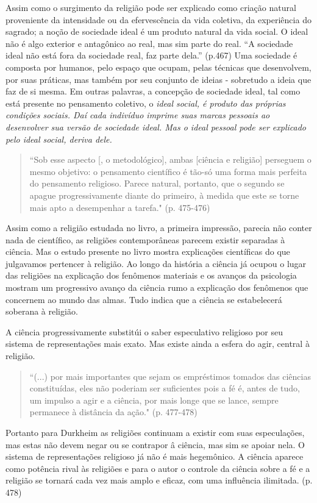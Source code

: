 \documentclass[12pt,a4paper]{article}
\begin{document}
Assim como o surgimento da religião pode ser explicado como criação natural proveniente da intensidade ou da efervescência da vida coletiva, da experiência do sagrado; a noção de sociedade ideal é um produto natural da vida social. O ideal não é algo exterior e antagônico ao real, mas sim parte do real. 
``A sociedade ideal não está fora da sociedade real, faz parte dela.”
(p.467)
Uma sociedade é composta por humanos, pelo espaço que ocupam, pelas técnicas que desenvolvem, por suas práticas, mas também por seu conjunto de ideias - sobretudo a ideia que faz de si mesma. Em outras palavras, a concepção de sociedade ideal, tal como está presente no pensamento coletivo, o \em ideal social\em, é produto das próprias condições sociais. Daí cada indivíduo imprime suas marcas pessoais ao desenvolver sua versão de sociedade ideal. Mas o \em ideal pessoal \em pode ser explicado pelo ideal social, deriva dele.




\begin{quote}
``Sob esse aspecto [, o metodológico], ambas [ciência e religião] perseguem o mesmo objetivo: o pensamento científico é tão-só uma forma mais perfeita do pensamento religioso. Parece natural, portanto, que o segundo se apague progressivamente diante do primeiro, à medida que este se torne mais apto a desempenhar a tarefa."
(p. 475-476)
\end{quote}

Assim como a religião estudada no livro, a primeira impressão, parecia não conter nada de científico, as religiões contemporâneas parecem existir separadas à ciência. Mas o estudo presente no livro mostra explicações científicas do que julgavamos pertencer à religião. Ao longo da história a ciência já ocupou o lugar das religiões na explicação dos fenômenos materiais e os avanços da psicologia mostram um progressivo avanço da ciência rumo a explicação dos fenômenos que concernem ao mundo das almas. Tudo indica que a ciência se estabelecerá soberana à religião.

A ciência progressivamente substitúi o saber especulativo religioso por seu sistema de representações mais exato. Mas existe ainda a esfera do agir, central à religião.

\begin{quote}
``(...) por mais importantes que sejam os empréstimos tomados das ciências constituídas, eles não poderiam ser suficientes pois a fé é, antes de tudo, um impulso a agir e a ciência, por mais longe que se lance, sempre permanece à distância da ação."
 (p. 477-478)
\end{quote}

Portanto para Durkheim as religiões continuam a existir com suas especulações, mas estas não devem negar ou se contrapor â ciência, mas sim se apoiar nela. O sistema de representações religioso já não é mais hegemônico. A ciência aparece como potência rival às religiões e para o autor o controle da ciência sobre a fé e a religião se tornará cada vez mais amplo e eficaz, com uma influência ilimitada. (p. 478)
\end{document}
